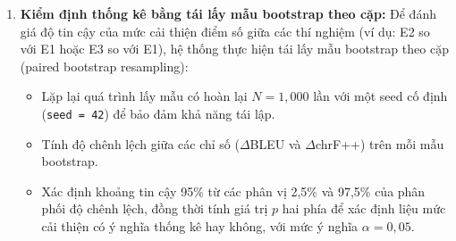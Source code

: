 \begin{enumerate}
    \item \textbf{Kiểm định thống kê bằng tái lấy mẫu bootstrap theo cặp:}
    Để đánh giá độ tin cậy của mức cải thiện điểm số giữa các thí nghiệm (ví dụ: E2 so với E1 hoặc E3 so với E1), hệ thống thực hiện tái lấy mẫu bootstrap theo cặp (paired bootstrap resampling):
    \begin{itemize}
        \item Lặp lại quá trình lấy mẫu có hoàn lại $N = 1{,}000$ lần với một seed cố định (\texttt{seed = 42}) để bảo đảm khả năng tái lập.
        \item Tính độ chênh lệch giữa các chỉ số ($\Delta$BLEU và $\Delta$chrF++) trên mỗi mẫu bootstrap.
        \item Xác định khoảng tin cậy 95\% từ các phân vị 2,5\% và 97,5\% của phân phối độ chênh lệch, đồng thời tính giá trị $p$ hai phía để xác định liệu mức cải thiện có ý nghĩa thống kê hay không, với mức ý nghĩa $\alpha = 0{,}05$.
    \end{itemize}
\end{enumerate}





